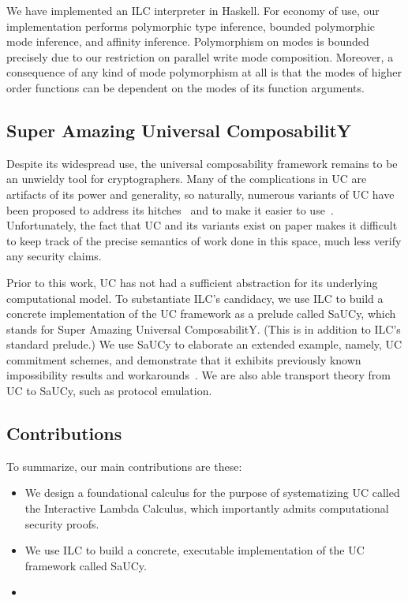 We have implemented an ILC interpreter in Haskell. For economy of use, our
implementation performs polymorphic type inference, bounded polymorphic mode
inference, and affinity inference. Polymorphism on modes is bounded precisely
due to our restriction on parallel write mode composition. Moreover, a
consequence of any kind of mode polymorphism at all is that the modes of higher
order functions can be dependent on the modes of its function arguments.

\subsection{Super Amazing Universal ComposabilitY}

 Despite its widespread use, the universal
composability framework remains to be an unwieldy tool for cryptographers. Many
of the complications in UC are artifacts of its power and generality, so
naturally, numerous variants of UC have been proposed to address its
hitches~\cite{backes2007reactive, hofheinz2015gnuc, canetti2007universally,
  canetti2003universal} and to make it easier to
use~\cite{canetti2015simpler}. Unfortunately, the fact that UC and its variants
exist on paper makes it difficult to keep track of the precise semantics of work
done in this space, much less verify any security claims.

Prior to this work, UC has not had a sufficient abstraction for its underlying
computational model. To substantiate ILC's candidacy, we use ILC to build a
concrete implementation of the UC framework as a prelude called SaUCy, which
stands for Super Amazing Universal ComposabilitY. (This is in addition to ILC's
standard prelude.) We use SaUCy to elaborate an extended example, namely, UC
commitment schemes, and demonstrate that it exhibits previously known
impossibility results and workarounds~\cite{canetti2001commitments}. We are also
able transport theory from UC to SaUCy, such as protocol emulation.

\subsection{Contributions}
\label{subsec:contributions}

To summarize, our main contributions are these:

\begin{itemize}[leftmargin=*]
  \item We design a foundational calculus for the purpose of systematizing UC
    called the Interactive Lambda Calculus, which importantly admits
    computational security proofs.
  \item We use ILC to build a concrete, executable implementation of the UC
    framework called SaUCy.
  \item {}
\end{itemize}

